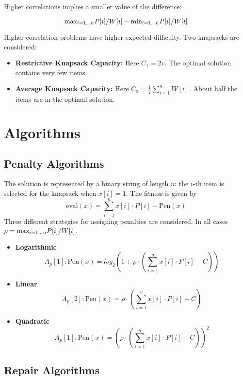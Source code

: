 \documentclass[../main.tex]{subfiles}
\begin{document}
Higher correlations implies a smaller value of the difference:

\begin{equation}
\text{max}_{i=1 \mathellipsis n} { P[i]/W[i]} - \text{min}_{i=1 \mathellipsis n} { P[i]/W[i]}
\end{equation}

Higher correlation problems have higher expected difficulty. Two knapsacks are considered:

\begin{itemize}
	\item \textbf{Restrictive Knapsack Capacity:} Here $C_1 = 2v$. The optimal solution contains very few items.
	\item \textbf{Average Knapsack Capacity:} Here $C_2 = \frac{1}{2} \sum^n_{i=1}W[i]$. About half the items are in
	the optimal solution.
\end{itemize}

\section{Algorithms}

\subsection{Penalty Algorithms}

The solution is represented by a binary string of length $n$: the $i$-th item is selected for the knapsack when $x[i] =
1$. The fitness is given by
\begin{equation}
\text{eval}(x) = \sum^n_{i=1} x[i] \cdot P[i] - \text{Pen}(x)
\end{equation}
Three different strategies for assigning penalties are considered. In all cases $\rho = \text{max}_{i=1 \mathellipsis
n} { P[i]/W[i]}$.

\begin{itemize}
	\item \textbf{Logarithmic} \\
	\[
	A_p[1]: \text{Pen}(x) = log_2(1 + \rho \cdot (\sum^n_{i=1} x[i] \cdot P[i] - C))
	\]
	\item \textbf{Linear}
	\[
	A_p[2]: \text{Pen}(x) = \rho \cdot (\sum^n_{i=1} x[i] \cdot P[i] - C)
	\]
	\item \textbf{Quadratic}
	\[
	A_p[1]: \text{Pen}(x) = (\rho \cdot (\sum^n_{i=1} x[i] \cdot P[i] - C))^2
	\]
\end{itemize}


\subsection{Repair Algorithms}
\end{document}
